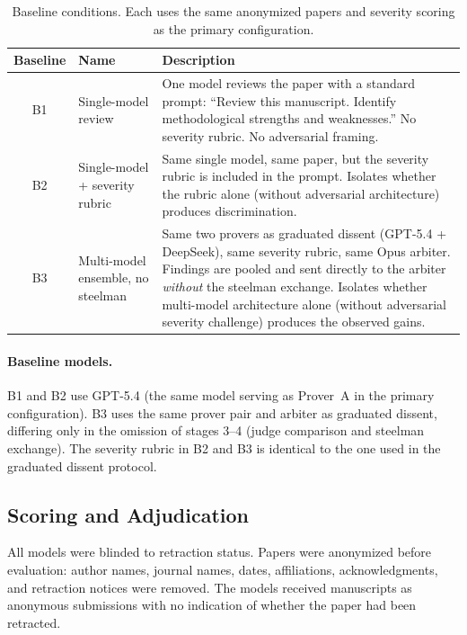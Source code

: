 \documentclass[11pt]{article}
\begin{document}
\begin{table}[h]
\centering
\caption{Baseline conditions. Each uses the same anonymized papers and severity scoring as the primary configuration.}
\label{tab:baselines}
\small
\begin{tabular}{clp{7cm}}
\toprule
\textbf{Baseline} & \textbf{Name} & \textbf{Description} \\
\midrule
B1 & Single-model review & One model reviews the paper with a standard prompt: ``Review this manuscript. Identify methodological strengths and weaknesses.'' No severity rubric. No adversarial framing. \\
B2 & Single-model + severity rubric & Same single model, same paper, but the severity rubric is included in the prompt. Isolates whether the rubric alone (without adversarial architecture) produces discrimination. \\
B3 & Multi-model ensemble, no steelman & Same two provers as graduated dissent (GPT-5.4 + DeepSeek), same severity rubric, same Opus arbiter. Findings are pooled and sent directly to the arbiter \emph{without} the steelman exchange. Isolates whether multi-model architecture alone (without adversarial severity challenge) produces the observed gains. \\
\bottomrule
\end{tabular}
\end{table}

\paragraph{Baseline models.} B1 and B2 use GPT-5.4 (the same model serving as Prover~A in the primary configuration). B3 uses the same prover pair and arbiter as graduated dissent, differing only in the omission of stages 3--4 (judge comparison and steelman exchange). The severity rubric in B2 and B3 is identical to the one used in the graduated dissent protocol.

\subsection{Scoring and Adjudication}
\label{sec:scoring}

All models were blinded to retraction status. Papers were anonymized before evaluation: author names, journal names, dates, affiliations, acknowledgments, and retraction notices were removed. The models received manuscripts as anonymous submissions with no indication of whether the paper had been retracted.
\end{document}

